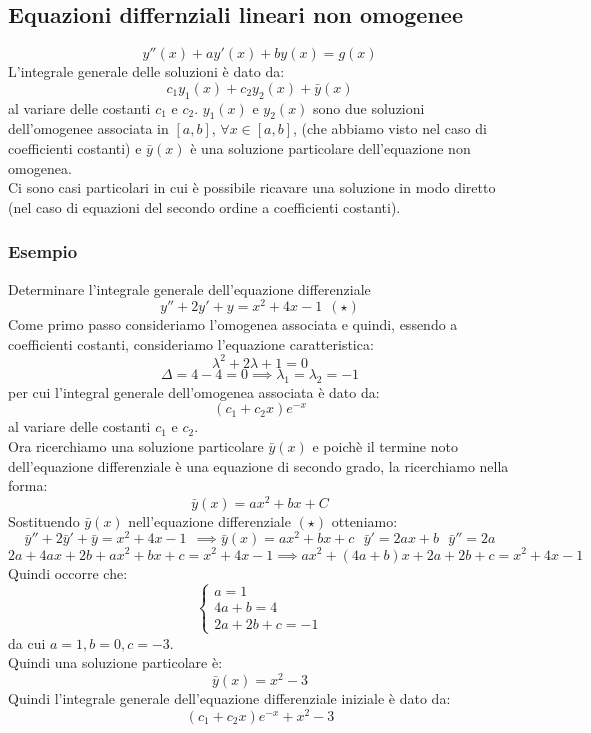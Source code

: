 \documentclass[../../main.tex]{subfiles}
\begin{document}
\subsection{Equazioni differnziali lineari non omogenee}
\[
    y''(x) + ay'(x) + by(x) = g(x)
\]
L'integrale generale delle soluzioni è dato da:
\[
    c_1y_1(x) + c_2y_2(x) + \bar{y}(x)
\]
al variare delle costanti $c_1$ e $c_2$. $y_1(x)$ e $y_2(x)$ sono due soluzioni
dell'omogenee associata in $[a, b]$, $\forall x \in [a, b]$, (che abbiamo visto
nel caso di coefficienti costanti) e $\bar{y}(x)$ è una soluzione particolare
dell'equazione non omogenea.\\ Ci sono casi particolari in cui è possibile
ricavare una soluzione in modo diretto (nel caso di equazioni del secondo
ordine a coefficienti costanti).

\subsubsection{Esempio}
Determinare l'integrale generale dell'equazione differenziale
\[
    y'' + 2y' + y = x^2+4x-1 \ \ (\star)
\]
Come primo passo consideriamo l'omogenea associata e quindi, essendo a
coefficienti costanti, consideriamo l'equazione caratteristica:
\[
    \lambda^2 + 2\lambda + 1 = 0
\]
\[
    \Delta = 4 - 4 = 0 \implies \lambda_1 = \lambda_2 = -1
\]
per cui l'integral generale dell'omogenea associata è dato da:
\[
    (c_1 + c_2x)e^{-x}
\]
al variare delle costanti $c_1$ e $c_2$.\\ Ora ricerchiamo una soluzione
particolare $\bar{y}(x)$ e poichè il termine noto dell'equazione differenziale
è una equazione di secondo grado, la ricerchiamo nella forma:
\[
    \bar{y}(x) = ax^2 + bx + C
\]
Sostituendo $\bar{y}(x)$ nell'equazione differenziale $(\star)$ otteniamo:
\[
    \bar{y}'' + 2\bar{y}' + \bar{y} =  x^2 + 4x - 1 \ \ \implies \bar{y}(x) = ax^2+bx+c \ \ \ \bar{y}' = 2ax + b \ \ \ \bar{y}'' = 2a
\]
\[
    2a + 4ax + 2b + ax^2 + bx + c = x^2 + 4x - 1 \implies ax^2 + (4a + b)x + 2a + 2b + c = x^2 + 4x - 1
\]
Quindi occorre che:
\[
    \begin{cases}
        a = 1      \\
        4a + b = 4 \\
        2a + 2b + c = -1
    \end{cases}
\]
da cui $a = 1, b = 0, c = -3$.\\ Quindi una soluzione particolare è:
\[
    \bar{y}(x) = x^2 - 3
\]
Quindi l'integrale generale dell'equazione differenziale iniziale è dato da:
\[
    (c_1 + c_2x)e^{-x} + x^2 - 3
\]
\end{document}
